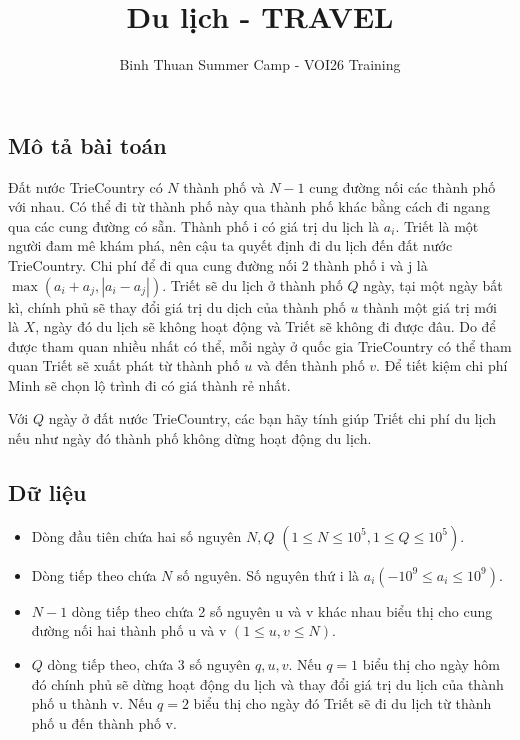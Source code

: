 \documentclass[12pt]{article}
\begin{document}
\title{Du lịch - TRAVEL}
\author{Binh Thuan Summer Camp - VOI26 Training}
\maketitle

\setlength{\parindent}{0pt}
\setlength{\parskip}{1em} 

\subsection*{Mô tả bài toán}
Đất nước TrieCountry có $N$ thành phố và $N - 1$ cung đường nối các thành phố với nhau. Có thể đi từ thành phố này qua thành phố khác bằng cách đi ngang qua các cung đường có sẵn. Thành phố i có giá trị du lịch là $a_i$. Triết là một người đam mê khám phá, nên cậu ta quyết định đi du lịch đến đất nước TrieCountry. Chi phí để đi qua cung đường nối 2 thành phố i và j là $ \max(a_i + a_j, |a_i - a_j|)$. Triết sẽ du lịch ở thành phố $Q$ ngày, tại một ngày bất kì, chính phủ sẽ thay đổi giá trị du dịch
của thành phố  $u$ thành một giá trị mới là $X$, ngày đó du lịch sẽ không hoạt động và Triết sẽ không
đi được đâu. Do để được tham quan nhiều nhất có thể, mỗi ngày ở quốc gia TrieCountry có thể tham
quan Triết sẽ xuất phát từ thành phố $u$ và đến thành phố $v$. Để tiết kiệm chi phí Minh sẽ chọn
lộ trình đi có giá thành rẻ nhất.

Với $Q$ ngày ở đất nước TrieCountry, các bạn hãy tính giúp Triết chi phí du lịch nếu như ngày đó thành
phố không dừng hoạt động du lịch.

\subsection*{Dữ liệu}
\begin{itemize}
  \item Dòng đầu tiên chứa hai số nguyên $N, Q$ $(1 \leq N \leq 10^5, 1 \leq Q \leq 10^5)$.
  \item Dòng tiếp theo chứa $N$ số nguyên. Số nguyên thứ i là $a_i (-10^9 \leq a_i \leq 10^9)$.
  \item $N - 1$ dòng tiếp theo chứa 2 số nguyên u và v khác nhau biểu thị cho cung đường nối hai thành phố u và v $(1 \leq u, v \leq N)$.
  \item $Q$ dòng tiếp theo, chứa 3 số nguyên $q, u, v$. Nếu $q = 1$ biểu thị cho ngày hôm đó chính phủ sẽ dừng hoạt động du lịch và thay đổi giá trị du lịch của thành phố u thành v. Nếu $q = 2$ biểu thị cho ngày đó Triết sẽ đi du lịch từ thành phố u đến thành phố v.
\end{itemize}
\end{document}
